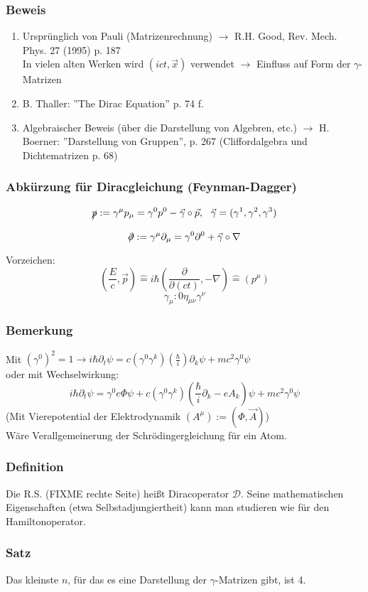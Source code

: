 \documentclass[twoside,a4paper]{scrartcl}
\newcommand{\D}{\mathcal{D}}
\renewcommand{\1}{\mathds{1}}
\newcommand{\ra}{\rightarrow}
\newcommand{\entspricht}{\mathrel{\widehat{=}}}
\begin{document}
\subsubsection*{Beweis}
\begin{enumerate}
\item Ursprünglich von Pauli (Matrizenrechnung) $\ra$ R.H. Good, Rev. Mech. Phys. 27 (1995) p. 187\\
In vielen alten Werken wird $(ict,\vec x)$ verwendet $\ra$ Einfluss auf Form der $\gamma$-Matrizen
\item B. Thaller: ''The Dirac Equation'' p. 74 f.
\item Algebraischer Beweis (über die Darstellung von Algebren, etc.) $\ra$ H. Boerner: ''Darstellung von Gruppen'', p. 267 (Cliffordalgebra und Dichtematrizen p. 68)
\end{enumerate}
\subsubsection*{Abkürzung für Diracgleichung (Feynman-Dagger)}
$$\xout{p}:=\gamma^\mu p_\mu=\gamma^0p^0-\vec \gamma \circ\vec p, \ \ \vec \gamma=(\gamma^1,\gamma^2,\gamma^3)$$
$$\xout{\partial}:=\gamma^\mu \partial_\mu=\gamma^0\partial^0+\vec \gamma \circ \nabla$$
Vorzeichen:
$$(\frac{E}{c},\vec p)\entspricht i\hbar(\frac{\partial}{\partial (ct)},-\nabla)\entspricht (p^\mu)$$
$$\gamma_\mu:0 \eta_{\mu\nu}\gamma^\nu$$
\subsubsection*{Bemerkung}
Mit $(\gamma^0)^2=1 \ra i \hbar \partial_t \psi=c(\gamma^0\gamma^k)(\frac{\hbar}{i})\partial_k \psi+mc^2\gamma^0 \psi$\\
oder mit Wechselwirkung:
$$i\hbar \partial_t \psi=\gamma^0e\Phi\psi+c(\gamma^0\gamma^k)(\frac{\hbar}{i}\partial_k -eA_k)\psi+mc^2\gamma^0 \psi$$
(Mit Vierepotential der Elektrodynamik $(A^\mu):=(\Phi,\vec A)$)\\
Wäre Verallgemeinerung der Schrödingergleichung für ein Atom.
\subsubsection*{Definition}
Die R.S. (FIXME rechte Seite) heißt Diracoperator $\D$. Seine mathematischen Eigenschaften (etwa Selbstadjungiertheit) kann man studieren wie für den Hamiltonoperator.
\subsubsection*{Satz}
Das kleinste $n$, für das es eine Darstellung der $\gamma$-Matrizen gibt, ist 4.
\end{document}
